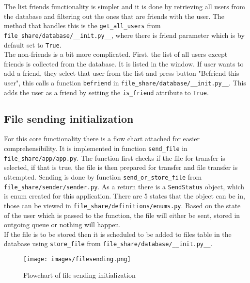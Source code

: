 The list friends functionality is simpler and it is done by retrieving all users from the database and filtering out the ones that are friends with the user.
The method that handles this is the \texttt{get\_all\_users} from \texttt{file\_share/database/\_\_init.py\_\_}, where there is friend parameter which is by default set to \texttt{True}.\\
The non-friends is a bit more complicated. First, the list of all users except friends is collected from the database. It is listed in the window. If user wants 
to add a friend, they select that user from the list and press button "Befriend this user", this calls a function \texttt{befriend} in \texttt{file\_share/database/\_\_init.py\_\_}.
This adds the user as a friend by setting the \texttt{is\_friend} attribute to \texttt{True}.

\subsection{File sending initialization}
For this core functionality there is a flow chart attached for easier comprehensibility. It is implemented in function \texttt{send\_file} in \texttt{file\_share/app/app.py}.
The function first checks if the file for transfer is selected, if that is true, the file is then prepared for transfer and file transfer is attempted. Sending is done by 
function \texttt{send\_or\_store\_file} from \texttt{file\_share/sender/sender.py}. As a return there is a \texttt{SendStatus} object, which is enum created for this application.
There are 5 states that the object can be in, those can be viewed in \texttt{file\_share/definitions/enums.py}. Based on the state of the user which is passed to the function,
the file will either be sent, stored in outgoing queue or nothing will happen.\\

If the file is to be stored then it is scheduled to be added to files table in the database using \texttt{store\_file} from \texttt{file\_share/database/\_\_init.py\_\_}.

\begin{figure}[ht]
    \centering
    \texttt{[image: images/filesending.png]}
    \caption{Flowchart of file sending initialization}
    \label{fig:flowchart}
\end{figure}
